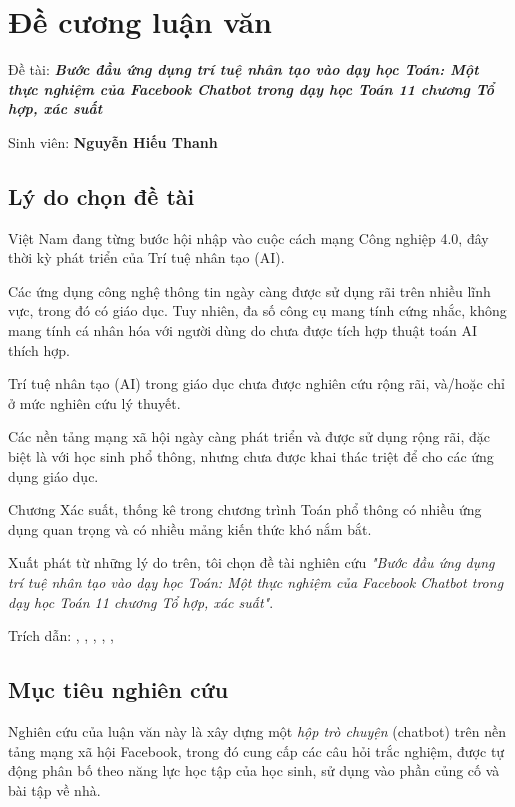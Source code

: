 \chapter*{Đề cương luận văn}

Đề tài: \textit{\textbf{Bước đầu ứng dụng trí tuệ nhân tạo vào dạy học Toán: Một thực nghiệm của Facebook Chatbot trong dạy học Toán 11 chương Tổ hợp, xác suất}}\par
Sinh viên: \textbf{Nguyễn Hiếu Thanh}\par
\renewcommand*{\thesection}{\arabic{section}}
\renewcommand*{\thesubsection}{\alph{subsection}}

\section{Lý do chọn đề tài}
Việt Nam đang từng bước hội nhập vào cuộc cách mạng Công nghiệp 4.0, đây thời kỳ phát triển của Trí tuệ nhân tạo (AI).\par
Các ứng dụng công nghệ thông tin ngày càng được sử dụng rãi trên nhiều lĩnh vực, trong đó có giáo dục. Tuy nhiên, đa số công cụ mang tính cứng nhắc, không mang tính cá nhân hóa với người dùng do chưa được tích hợp thuật toán AI thích hợp.\par
Trí tuệ nhân tạo (AI) trong giáo dục chưa được nghiên cứu rộng rãi, và/hoặc chỉ ở mức nghiên cứu lý thuyết.\par
Các nền tảng mạng xã hội ngày càng phát triển và được sử dụng rộng rãi, đặc biệt là với học sinh phổ thông, nhưng chưa được khai thác triệt để cho các ứng dụng giáo dục.\par
Chương Xác suất, thống kê trong chương trình Toán phổ thông có nhiều ứng dụng quan trọng và có nhiều mảng kiến thức khó nắm bắt.\par
Xuất phát từ những lý do trên, tôi chọn đề tài nghiên cứu \textit{"Bước đầu ứng dụng trí tuệ nhân tạo vào dạy học Toán: Một thực nghiệm của Facebook Chatbot trong dạy học Toán 11 chương Tổ hợp, xác suất"}.\par
Trích dẫn: \cite{goksel2019artificial}, \cite{garito1991artificial}, \cite{beck1996applications}, \cite{jones1985applications}, \cite{nguyen2018tri}, \cite{timms2016letting}\par

\section{Mục tiêu nghiên cứu}
Nghiên cứu của luận văn này là xây dựng một \textit{hộp trò chuyện} (chatbot) trên nền tảng mạng xã hội Facebook, trong đó cung cấp các câu hỏi trắc nghiệm, được tự động phân bố theo năng lực học tập của học sinh, sử dụng vào phần củng cố và bài tập về nhà.

